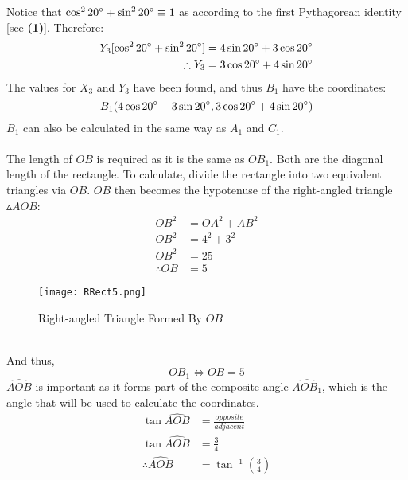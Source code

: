 \documentclass{article}
\begin{document}
            Notice that $\cos^2{20\degree} + \sin^2{20\degree} \equiv 1$ as according to the first Pythagorean identity [see \textbf{(1)}]. Therefore:
            \begin{align*}
                Y_3[\cos^2{20\degree} + \sin^2{20\degree}] &= 4\sin{20\degree} + 3\cos{20\degree} \\
                \therefore Y_3 &= 3\cos{20\degree} + 4\sin{20\degree}
            \end{align*}
            The values for $X_3$ and $Y_3$ have been found, and thus $B_1$ have the coordinates:
            \begin{equation}
                B_1(4\cos{20\degree} - 3\sin{20\degree}, 3\cos{20\degree} + 4\sin{20\degree})
            \end{equation} \newpage
            $B_1$ can also be calculated in the same way as $A_1$ and $C_1$.
            \\\\
            The length of $OB$ is required as it is the same as $OB_1$. Both are the diagonal length of the rectangle. To calculate, divide the rectangle into two equivalent triangles via $OB$. $OB$ then becomes the hypotenuse of the right-angled triangle $\vartriangle{AOB}$:
            \begin{align*}
                OB^2 &= OA^2 + AB^2 \\
                OB^2 &= 4^2 + 3^2 \\
                OB^2 &= 25 \\
                \therefore OB &= 5
            \end{align*}
            \begin{figure}[h!]
                \texttt{[image: RRect5.png]}
                \caption{Right-angled Triangle Formed By $OB$}
                \label{fig:rrect5}
            \end{figure} \\
            And thus,
            \begin{equation}
                OB_1 \Leftrightarrow OB = 5
            \end{equation}
            $\widehat{AOB}$ is important as it forms part of the composite angle $\widehat{AOB_1}$, which is the angle that will be used to calculate the coordinates.
            \begin{align*}
                \tan{\widehat{AOB}} &= \frac{opposite}{adjacent} \\
                \tan{\widehat{AOB}} &= \frac{3}{4} \\
                \therefore \widehat{AOB} &= \tan^{-1}{\left(\frac{3}{4}\right)}
            \end{align*}
\end{document}
